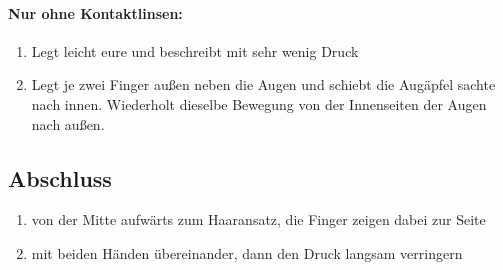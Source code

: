 \paragraph{Nur ohne Kontaktlinsen:}
\begin{enumerate}
  \item Legt leicht eure  und beschreibt mit sehr wenig Druck 
  \item {} Legt je zwei Finger außen neben die Augen und schiebt die Augäpfel sachte nach innen. Wiederholt dieselbe Bewegung von der Innenseiten der Augen nach außen.
\end{enumerate}


\subsection{Abschluss}
\begin{enumerate}
  \item {} von der Mitte aufwärts zum Haaransatz, die Finger zeigen dabei zur Seite
  \item {} mit beiden Händen übereinander, dann den Druck langsam verringern
\end{enumerate}
